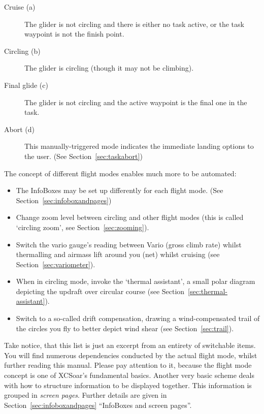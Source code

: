 \begin{description}
\item[Cruise (a)]   The glider is not circling and there is either no 
task active, or the task waypoint is not the finish point.
\item[Circling (b)]  The glider is circling (though it may not be climbing).
\item[Final glide (c)]  The glider is not circling and the active waypoint 
is the final one in the task.
\item[Abort (d)]  This manually-triggered mode indicates the immediate 
landing options to the user. (See Section~\ref{sec:taskabort})
\end{description}

The concept of different flight modes enables much more to be automated:
\begin{itemize}
\item {} The InfoBoxes may be set up differently for 
each flight mode. (See Section~\ref{sec:infoboxandpages})
\item {} Change zoom level between circling and other 
flight modes (this is called `circling zoom', see Section~\ref{sec:zooming}).
\item {} Switch the vario gauge's reading between Vario 
(gross climb rate) whilst thermalling and airmass lift around you (net) whilst cruising 
(see Section~\ref{sec:variometer}).
\item {} When in circling mode, invoke the 
`thermal assistant', a small polar diagram depicting the updraft over 
circular course (see Section~\ref{sec:thermal-assistant}).
\item {} Switch to a so-called drift compensation, 
drawing a wind-compensated trail of the circles you fly to better depict 
wind shear (see Section~\ref{sec:trail}).
\end{itemize}

Take notice, that this list is just an excerpt from an entirety of 
switchable items. You will find numerous dependencies conducted by the 
actual flight mode, whilst further reading this manual. Please pay 
attention to it, because the flight mode concept is one of XCSoar's
fundamental basics. Another very basic scheme deals with how to structure 
information to be displayed together. This information is grouped in
\emph{screen pages}. Further details are given in Section~\ref{sec:infoboxandpages}
``InfoBoxes and screen pages''.


